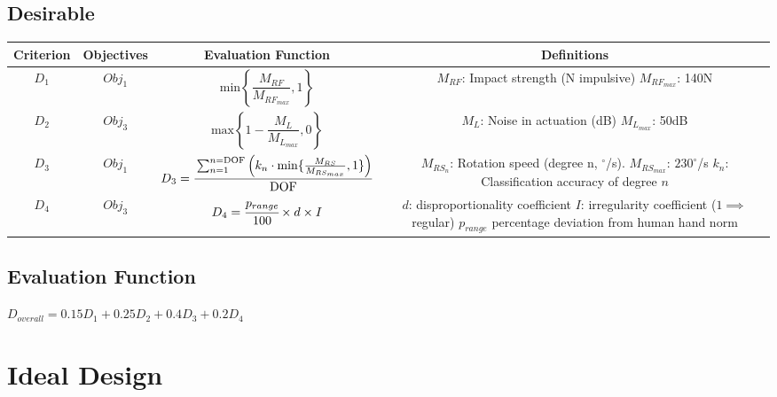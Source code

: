 \documentclass[11pt,3p]{report}
\begin{document}
	\subsection{Desirable} \label{des}
		\begin{center}
			\begin{tabular}{ |c|c|c|c| } 
 \hline
 Criterion & Objectives & Evaluation Function & Definitions \\ 
 \hline\hline
 $D_1$ & $Obj_1$ & $\text{min} \left \{\dfrac{M_{RF}}{M_{RF_{max}}},1 \right \}$ &  \makecell[l]{
  \vspace{1mm}
 $M_{RF}$: Impact strength (N impulsive) \\
 $M_{RF_{max}}$: 140N
 \vspace{1mm}
 } \\
 \hline
 
 $D_2$ & $Obj_3$ & $\text{max} \left \{1-\dfrac{M_L}{M_{L_{max}}}, 0 \right \}$ &  \makecell[l]{
 \vspace{2mm}
 $M_L$: Noise in actuation (dB) \\
 $M_{L_{max}}$: 50dB
 } \\
 \hline

 $D_3$ & $Obj_1$ & $D_3 =  \cfrac{\sum_{n=1}^{n=\text{DOF}} \left(k_n \cdot \text{min}\{\frac{M_{RS}}{M_{RS_{max}}},1\} \right)}{\text{DOF}}$ &  \makecell[l]{
 $M_{RS_n}$: Rotation speed (degree n, $^\circ$/s). \\
 $M_{RS_{max}}$: $230^\circ$/s \\
 $k_n$: Classification accuracy of degree $n$
 } \\
 \hline
 $D_4$ & $Obj_3$ & $D_4 = \cfrac{p_{range}}{100} \times d  \times I $ &  \makecell[l]{
$d$: disproportionality coefficient \\
 $I$: irregularity coefficient ($1 \implies$ regular) \\
 $p_{range}$ percentage deviation from \\
 human hand norm
 } \\
 
 \hline
		\end{tabular}
	\end{center}

\subsection{Evaluation Function}
$D_{overall} = 0.15 D_1 + 0.25 D_2 + 0.4 D_3 + 0.2 D_4$

\pagebreak

\section{Ideal Design}
\end{document}
